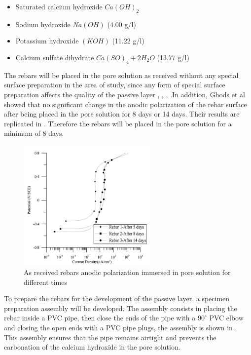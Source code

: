 \begin{itemize}
	\item Saturated calcium hydroxide $Ca(OH)_2$
	\item Sodium hydroxide $Na(OH)$ (4.00 g/l)
	\item Potassium hydroxide $(KOH)$ (11.22 g/l)
	\item Calcium sulfate dihydrate $Ca(SO)_4 + 2H_2O$ (13.77 g/l)
\end{itemize}

The rebars will be placed in the pore solution as received without any special surface preparation in the area of study, since any form of special surface preparation affects the quality of the passive layer \cite{Andersson1989}, \cite{DawnMarcotte2001}, \cite{Moragues1987}, \cite{Page1983}.In addition, Ghods et al showed that no significant change in the anodic polarization of the rebar surface after being placed in the pore solution for 8 days or 14 days. Their results are replicated in . Therefore the rebars will be placed in the pore solution for a minimum of 8 days. 

\begin{figure}[htbp]
	\centering
	\includegraphics[width=0.6\textwidth]{Chapter-3/figs/AsReceived_AnodicPolarization_time}
	\caption{As received rebars anodic polarization immersed in pore solution for different times\cite{Ghods2009}}
	\label{fig:GhodsRebarPassivation}
\end{figure}

To prepare the rebars for the development of the passive layer, a specimen preparation assembly will be developed. The assembly consists in placing the rebar inside a PVC pipe, then close the ends of the pipe  with a $90^{\circ}$ PVC elbow and closing the open ends with a PVC pipe plugs, the assembly is shown in . This assembly ensures that the pipe remains airtight and prevents the carbonation of the calcium hydroxide in the pore solution.

